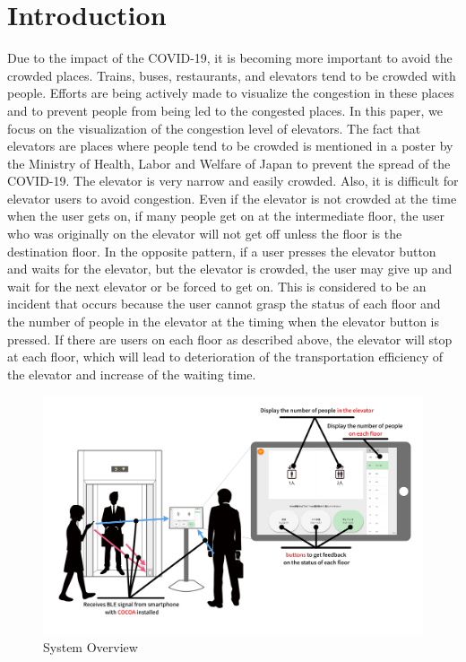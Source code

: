 \section{Introduction}
Due to the impact of the COVID-19, it is becoming more important to avoid the crowded places. Trains, buses, restaurants, and elevators tend to be crowded with people. Efforts are being actively made to visualize the congestion in these places and to prevent people from being led to the congested places. In this paper, we focus on the visualization of the congestion level of elevators. The fact that elevators are places where people tend to be crowded is mentioned in a poster by the Ministry of Health, Labor and Welfare of Japan to prevent the spread of the COVID-19\cite{ministry}. The elevator is very narrow and easily crowded. Also, it is difficult for elevator users to avoid congestion. Even if the elevator is not crowded at the time when the user gets on, if many people get on at the intermediate floor, the user who was originally on the elevator will not get off unless the floor is the destination floor. In the opposite pattern, if a user presses the elevator button and waits for the elevator, but the elevator is crowded, the user may give up and wait for the next elevator or be forced to get on. This is considered to be an incident that occurs because the user cannot grasp the status of each floor and the number of people in the elevator at the timing when the elevator button is pressed. If there are users on each floor as described above, the elevator will stop at each floor, which will lead to deterioration of the transportation efficiency of the elevator and increase of the waiting time.


\begin{figure}[t]
\begin{center}
\includegraphics[clip, width=1.0\hsize]{img/system.png}
\caption{System Overview}
\label{fig:system}
\end{center}
\end{figure}



